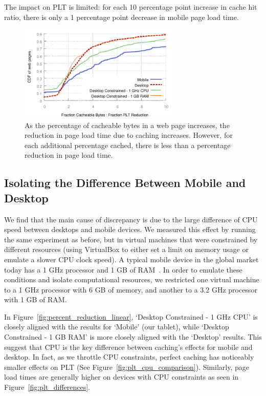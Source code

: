The impact on PLT is limited: for each 10 percentage point increase in cache hit ratio, there is only a 1 percentage point decrease in mobile page load time.
\begin{figure}[t]
    \includegraphics[width=3in]{../graphs/ratio_bytes_to_reduction/ratio_linear_comparison.pdf}
    \caption[]{\label{fig:ratio_linear_comparison}As the percentage of cacheable bytes in a web page increases, the reduction in page load time due to caching increases. However, for each additional percentage cached, there is less than a percentage reduction in page load time.}
\end{figure}
\subsection{Isolating the Difference Between Mobile and Desktop}


We find that the main cause of discrepancy is due to the large difference of CPU speed between desktops and mobile devices. 
We measured this effect by running the same experiment as before, but in virtual machines that were constrained by different resources (using VirtualBox to either set a limit on memory usage or emulate a slower CPU clock speed).
A typical mobile device in the global market today has a 1 GHz processor and 1 GB of RAM~\cite{mobile-stats}. In order to emulate these conditions and isolate computational resources, we restricted one virtual machine to a 1 GHz processor with 6 GB of memory, and another to a 3.2 GHz processor with 1 GB of RAM.

In Figure~\ref{fig:percent_reduction_linear}, `Desktop Constrained - 1 GHz CPU' is closely aligned with the results for `Mobile' (our tablet), while `Desktop Constrained - 1 GB RAM' is more closely aligned with the `Desktop' results.
This suggest that CPU is the key difference between caching's effects for mobile and desktop.
In fact, as we throttle CPU constraints, perfect caching has noticeably smaller effects on PLT (See Figure~\ref{fig:plt_cpu_comparison}). Similarly, page load times are generally higher on devices with CPU constraints as seen in Figure~\ref{fig:plt_differences}.

